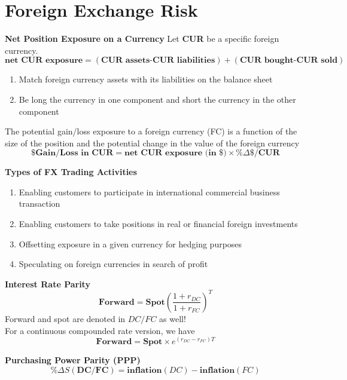 \documentclass[11pt,fleqn]{report} %
\numberwithin{equation}{section} %
\numberwithin{figure}{section} %
\numberwithin{table}{section} %
\begin{document}
\chapter{Foreign Exchange Risk}
 \begin{definition}\textbf{Net Position Exposure on a Currency} Let \textbf{CUR} be a specific foreign currency.
    $$
    \textbf{net CUR exposure}=(\textbf{CUR assets-CUR liabilities})+(\textbf{CUR bought-CUR sold})
    $$
 \end{definition}
 \begin{remark}
    \begin{enumerate}
        \item Match foreign currency assets with its liabilities on the balance sheet
        \item Be long the currency in one component and short the currency in the other component
    \end{enumerate}
 \end{remark}
 \begin{definition} The potential gain/loss exposure to a foreign currency (FC) is a function of 
    the size of the position and the potential change in the value of the foreign currency
    $$
    \textbf{\$ Gain/Loss in CUR}=\textbf{net CUR exposure (in \$)}\times\textbf{\%$\Delta\$/$CUR}
    $$
 \end{definition}
 \begin{definition}\textbf{Types of FX Trading Activities}
    \begin{enumerate}
        \item Enabling customers to participate in international commercial
        business transaction
        \item Enabling customers to take positions in real or financial foreign investments
        \item Offsetting exposure in a given currency for hedging purposes
        \item Speculating on foreign currencies in search of profit
    \end{enumerate}
 \end{definition}
 \begin{theorem}\textbf{Interest Rate Parity}
    $$
    \textbf{Forward}=\textbf{Spot}\left(\frac{1+r_{DC}}{1+r_{FC}}\right)^T
    $$
    Forward and spot are denoted in $DC/FC$ as well!\\
    For a continuous compounded rate version, we have
    $$
    \textbf{Forward}=\textbf{Spot}\times e^{\left(r_{DC}-r_{FC}\right)T}
    $$
 \end{theorem}
 \begin{theorem}\textbf{Purchasing Power Parity (PPP)}
    $$
    \%\Delta S(\textbf{DC/FC})=\textbf{inflation}(DC)-\textbf{inflation}(FC)
    $$
 \end{theorem}
\end{document}
